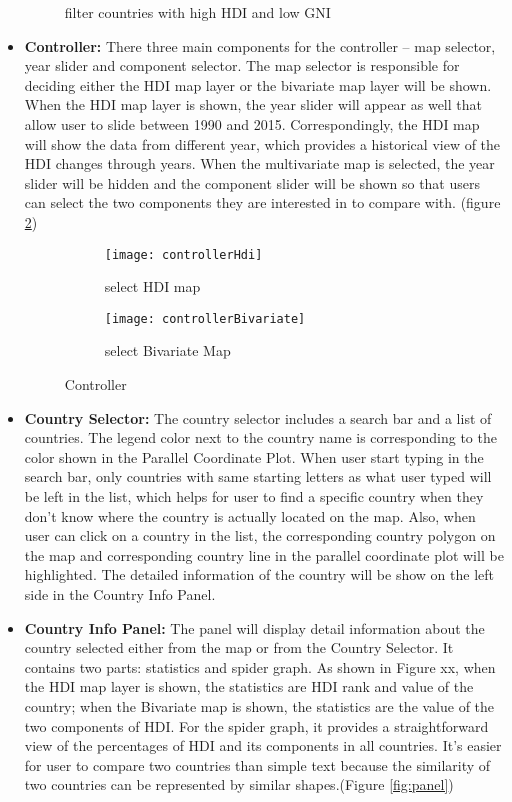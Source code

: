 \begin{itemize}
\begin{figure}[h!]
		\caption{filter countries with high HDI and low GNI}
		\label{fig:parallel}
	\end{figure}
	\item \textbf{Controller:} There three main components for the controller -- map selector, year slider and component selector. The map selector is responsible for deciding either the HDI map layer or the bivariate map layer will be shown. When the HDI map layer is shown, the year slider will appear as well that allow user to slide between 1990 and 2015. Correspondingly, the HDI map will show the data from different year, which provides a historical view of the HDI changes through years. When the multivariate map is selected, the year slider will be hidden and the component slider will be shown so that users can select the two components they are interested in to compare with. (figure \ref{fig:controller})
	\begin{figure}[h!]
		\centering
		\begin{subfigure}[b]{0.4\linewidth}
			\texttt{[image: controllerHdi]}
			\caption{select HDI map}
		\end{subfigure}
		\begin{subfigure}[b]{0.4\linewidth}
			\texttt{[image: controllerBivariate]}
			\caption{select Bivariate Map}
		\end{subfigure}
		\caption{Controller}
		\label{fig:controller}
	\end{figure}
    \item \textbf{Country Selector:} The country selector includes a search bar and a list of countries. The legend color next to the country name is corresponding to the color shown in the Parallel Coordinate Plot. When user start typing in the search bar, only countries with same starting letters as what user typed will be left in the list, which helps for user to find a specific country when they don't know where the country is actually located on the map. Also, when user can click on a country in the list, the corresponding country polygon on the map and corresponding country line in the parallel coordinate plot will be highlighted. The detailed information of the country will be show on the left side in the Country Info Panel.
    \item \textbf{Country Info Panel:} The panel will display detail information about the country selected either from the map or from the Country Selector. It contains two parts: statistics and spider graph. As shown in Figure xx, when the HDI map layer is shown,  the statistics are  HDI rank and value of the country; when the Bivariate map is shown, the statistics are the value of the two components of HDI. For the spider graph, it provides a straightforward view of the percentages of HDI and its components in all countries. It's easier for user to compare two countries than simple text because the similarity of two countries can be  represented by similar shapes.(Figure \ref{fig:panel})

\end{itemize}
